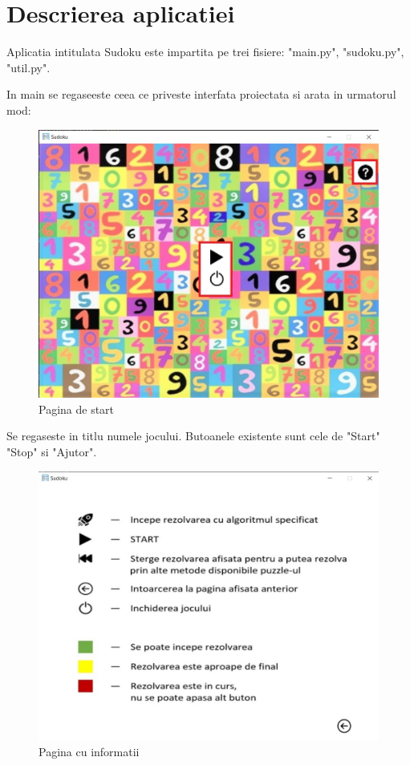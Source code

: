 \documentclass[a4paper,18pt]{article}
\begin{document}
\section{ Descrierea aplicatiei}

\tab Aplicatia intitulata Sudoku este impartita pe trei fisiere: "main.py", "sudoku.py", "util.py".

 In main se regaseeste ceea ce priveste interfata proiectata si arata in urmatorul mod:

\begin{figure}[h!]
\begin{center}
  \includegraphics[width=0.8\linewidth]{1.jpg}
  \caption{Pagina de start}
  \label{fig:start}
\end{center}
\end{figure}

\newpage
Se regaseste in titlu numele jocului. Butoanele existente sunt cele de "Start" "Stop" si "Ajutor". 

\begin{figure}[h!]
  \includegraphics[width=\linewidth]{2.jpg}
  \caption{Pagina cu informatii}
  \label{fig:2nd}
\end{figure}
\end{document}
